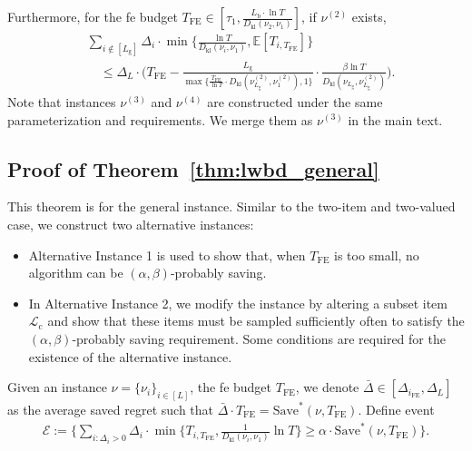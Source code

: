 \documentclass[twoside,11pt]{article}
\newcommand{\kl}{D_{\mathrm{kl}}}
\newcommand{\calE}{\mathcal{E}}
\newcommand{\calL}{\mathcal{L}}
\newcommand{\rmb}{\mathrm{b}}
\newcommand{\rmc}{\mathrm{c}}
\newcommand{\rmg}{\mathrm{g}}
\newcommand{\bbE}{\mathbb{E}}
\newcommand{\Tfe}{T_{\mathrm{FE}}}
\newcommand{\Saved}{\mathrm{Save}}
\newcommand{\ife}{i_{\mathrm{FE}}}
\newcommand{\barDelta}{\bar{\Delta}}
\begin{document}
Furthermore,  for the \ac{fe} budget $\Tfe\in[\tau_1, \frac{L_{\rmb}\cdot\ln T}{\kl(\nu_2,\nu_1)}]$, if $\nu^{(2)}$ exists,
\begin{align}
    &\sum_{i\notin [L_{\rmg}]}
    \Delta_i\cdot \min\bigg\{\frac{\ln T}{\kl(\nu_i,\nu_1)},\bbE[T_{i,\Tfe}]\bigg\}
    \\
    &\quad\leq 
     \Delta_L \cdot \bigg(
            \Tfe - 
            \frac{L_{\rmg}}{\max\Big\{\frac{\Tfe}{\ln T}\cdot \kl(\nu_{L_{\rmg}}^{(2)},\nu_{1}^{(2)}),1\Big\}}\cdot\frac{\beta\ln T}{\kl(\nu_{L_{\rmg}},\nu_{L_{\rmg}}^{(2)})}
        \bigg).
\end{align}
Note that instances $\nu^{(3)}$ and $\nu^{(4)}$ are constructed under the same parameterization and requirements. We merge them as $\nu^{(3)}$ in the main text.




\subsection{Proof of Theorem~\ref{thm:lwbd_general}}\label{app:lwbd_general_case}
This theorem is for the general instance. Similar to the two-item and two-valued case, we construct two alternative instances:
\begin{itemize}[leftmargin=1em,parsep=1pt,topsep=1pt]
    \item Alternative Instance 1 is used to show that, when $\Tfe$ is too small, no algorithm can be $(\alpha,\beta)$-probably saving.
    \item In Alternative Instance 2, we modify the instance by altering a subset item $\calL_{\rmc}$ and show that these items must be sampled sufficiently often to satisfy the $(\alpha,\beta)$-probably saving requirement. Some conditions are required for the existence of the alternative instance.
\end{itemize}
Given an instance  $\nu = \{\nu_i\}_{i\in[L]}$, the \ac{fe} budget $\Tfe$, we denote $\barDelta\in[\Delta_{\ife},\Delta_L]$ as the average saved regret such that $\barDelta\cdot \Tfe = \Saved^*(\nu,\Tfe) $.
Define event 
\begin{align}
    \calE:= \bigg\{\sum_{i:\Delta_{i}>0} \Delta_{i}\cdot \min\bigg\{ T_{i,\Tfe},\frac{1}{\kl(\nu_i,\nu_1)}\ln T\bigg\}
    \geq
    \alpha\cdot\Saved^*(\nu,\Tfe)\bigg\}.
\end{align}
\end{document}
